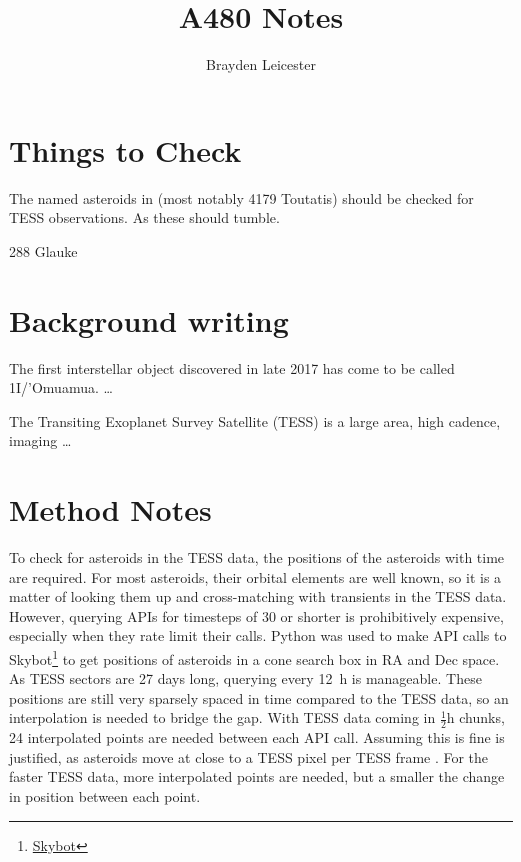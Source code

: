 \documentclass[12pt]{article}
\title{A480 Notes}
\author{Brayden Leicester}
\begin{document}
\maketitle

\section{Things to Check}
The named asteroids in \cite{Harris1994} (most notably 4179 Toutatis) should be checked for TESS observations. As these should tumble.

288 Glauke \cite{Harris2015}

\section{Background writing}

The first interstellar object discovered in late 2017 has come to be called 1I/'Omuamua. \dots

The Transiting Exoplanet Survey Satellite (TESS) \cite{Ricker2014} is a large area, high cadence, imaging \dots

\section{Method Notes}

To check for asteroids in the TESS data, the positions of the asteroids with time are required.
For most asteroids, their orbital elements are well known, so it is a matter of looking them up and cross-matching with transients in the TESS data.
However, querying APIs for timesteps of \qty{30}{\min} or shorter is
prohibitively expensive, especially when they rate limit their calls.
Python was used to make API calls to {Skybot}\footnote{\href{https://vo.imcce.fr/webservices/skybot/}{Skybot}} to get positions of asteroids in a cone search box in RA and Dec space.
As TESS sectors are 27%
days long, querying every \qty{12}{\hour} is manageable.
These positions are still very sparsely spaced in time compared to the TESS data, so an interpolation is needed to bridge the gap.
With TESS data coming in $\frac12\unit{\hour}$ chunks, 24 interpolated points are needed between each API call.
Assuming this is fine is justified, as asteroids move at close to a TESS pixel per TESS frame \citep{Pal2018,Pal2020}.
For the faster TESS data, more interpolated points are needed, but a smaller the change in position between each point.
\end{document}
